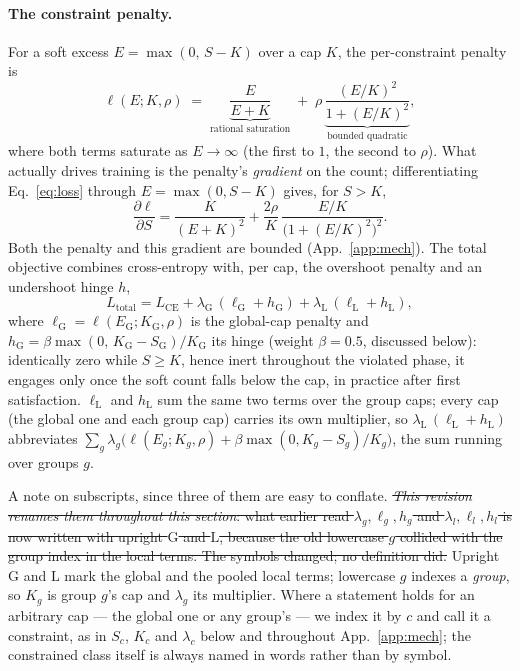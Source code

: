 \documentclass[10pt]{article}
\newcommand{\del}[1]{{\color{red}\sout{#1}}}
\begin{document}
\paragraph{The constraint penalty.}
For a soft excess $E = \max(0,\, S - K)$ over a cap $K$, the per-constraint
penalty is
\begin{equation}
\label{eq:loss}
\ell(E;K,\rho)\;=\;\underbrace{\frac{E}{E+K}}_{\text{rational saturation}}
\;+\;\rho\,\underbrace{\frac{(E/K)^2}{1+(E/K)^2}}_{\text{bounded quadratic}} ,
\end{equation}
where both terms saturate as $E\!\to\!\infty$ (the first to $1$, the second
to $\rho$). What actually drives training is the penalty's \emph{gradient}
on the count; differentiating Eq.~\eqref{eq:loss} through $E=\max(0,S-K)$
gives, for $S>K$,
\begin{equation}
\label{eq:grad}
\frac{\partial \ell}{\partial S}
= \frac{K}{(E+K)^2} + \frac{2\rho}{K}\,\frac{E/K}{\bigl(1+(E/K)^2\bigr)^2}.
\end{equation}
Both the penalty and this gradient are bounded (App.~\ref{app:mech}). The
total objective combines cross-entropy with, per cap, the overshoot penalty
and an undershoot hinge $h$,
\begin{equation}
\label{eq:total}
L_{\text{total}} = L_{\text{CE}} + \lambda_{\mathrm{G}}\,(\ell_{\mathrm{G}} + h_{\mathrm{G}}) + \lambda_{\mathrm{L}}\,(\ell_{\mathrm{L}} + h_{\mathrm{L}}) ,
\end{equation}
where $\ell_{\mathrm{G}}=\ell(E_{\mathrm{G}};K_{\mathrm{G}},\rho)$ is the global-cap penalty and
$h_{\mathrm{G}}=\beta\max(0,\,K_{\mathrm{G}}-S_{\mathrm{G}})/K_{\mathrm{G}}$ its hinge (weight $\beta{=}0.5$, discussed below):
identically zero while $S\ge K$, hence inert throughout the violated phase,
it engages only once the soft count falls below the cap, in practice after
first satisfaction. $\ell_{\mathrm{L}}$ and $h_{\mathrm{L}}$ sum the same two terms over the
group caps; every cap (the global one and each group cap) carries its own
multiplier, so $\lambda_{\mathrm{L}}\,(\ell_{\mathrm{L}}+h_{\mathrm{L}})$ abbreviates
$\sum_g \lambda_g\bigl(\ell(E_g;K_g,\rho)+\beta\max(0,K_g-S_g)/K_g\bigr)$, the sum running over groups $g$.

{\color{blue}A note on subscripts, since three of them are easy to conflate.
\del{\emph{This revision renames them throughout this section}: what earlier read
$\lambda_g,\ell_g,h_g$ and $\lambda_l,\ell_l,h_l$ is now written with upright
$\mathrm{G}$ and $\mathrm{L}$, because the old lowercase $g$ collided with the
group index in the local terms. The symbols changed; no definition did.}
Upright $\mathrm{G}$ and $\mathrm{L}$ mark the global and the pooled local terms;
lowercase $g$ indexes a \emph{group}, so $K_g$ is group $g$'s cap and
$\lambda_g$ its multiplier. Where a statement holds for an arbitrary cap --- the
global one or any group's --- we index it by $c$ and call it a constraint, as in
$S_c$, $K_c$ and $\lambda_c$ below and throughout App.~\ref{app:mech}; the
constrained class itself is always named in words rather than by symbol.}
\end{document}
